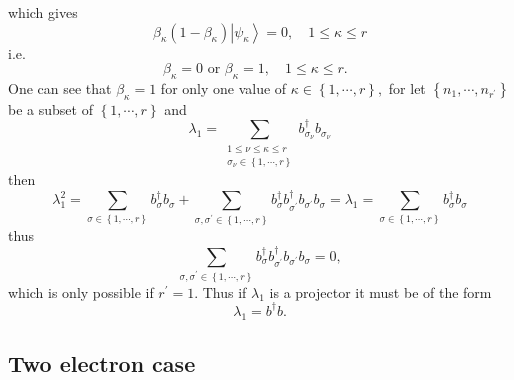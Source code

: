 \documentclass[aps,preprint]{revtex4}%
\begin{document}
which gives
\begin{equation}
\beta_{\kappa}\left(  1-\beta_{\kappa}\right)  \left\vert \psi_{\kappa
}\right\rangle =0,\quad1\leq\kappa\leq r
\end{equation}
i.e.
\begin{equation}
\beta_{\kappa}=0\text{ or }\beta_{\kappa}=1,\quad1\leq\kappa\leq r.\text{ }%
\end{equation}
One can see that $\beta_{\kappa}=1$ for only one value of $\kappa\in\left\{
1,\cdots,r\right\}  ,$ for let $\left\{  n_{1},\cdots,n_{r^{\prime}}\right\}
$ be a subset of $\left\{  1,\cdots,r\right\}  $ and
\begin{equation}
\lambda_{1}=\sum_{\substack{1\leq\nu\leq\kappa\leq r\\\sigma_{\nu}\in\left\{
1,\cdots,r\right\}  }}b_{\sigma_{\nu}}^{\dagger}b_{\sigma_{\nu}}%
\end{equation}
then
\begin{equation}
\lambda_{1}^{2}=\sum_{\sigma\in\left\{  1,\cdots,r\right\}  }b_{\sigma
}^{\dagger}b_{\sigma}+\sum_{\sigma,\sigma^{\prime}\in\left\{  1,\cdots
,r\right\}  }b_{\sigma}^{\dagger}b_{\sigma^{\prime}}^{\dagger}b_{\sigma
^{\prime}}b_{\sigma}=\lambda_{1}=\sum_{\sigma\in\left\{  1,\cdots,r\right\}
}b_{\sigma}^{\dagger}b_{\sigma}%
\end{equation}
thus
\begin{equation}
\sum_{\sigma,\sigma^{\prime}\in\left\{  1,\cdots,r\right\}  }b_{\sigma
}^{\dagger}b_{\sigma^{\prime}}^{\dagger}b_{\sigma^{\prime}}b_{\sigma}=0,
\end{equation}
which is only possible if $r^{\prime}=1.$ Thus if $\lambda_{1}$ is a projector
it must be of the form
\begin{equation}
\lambda_{1}=b^{\dagger}b.
\end{equation}


\subsection{Two electron case}
\end{document}
